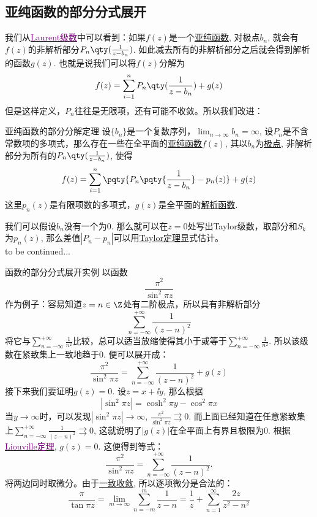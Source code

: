 \documentclass[UTF8]{ctexart}
\newcommand{\hyperrefc}[2]{\hyperref[#1]{\textcolor{purple}{#2}}}
\newcommand{\continued}{{\Large to be continued...}}
\newcommand{\AnalyticalFunction}{\hyperref[dfn:AnalyticalFunction]{解析函数}}
\newcommand{\UniformConvergence}{\hyperref[dfn:UniformConvergence]{一致收敛}}
\newcommand{\MeromorphicFunction}{\hyperref[dfn:MeromorphicFunction]{亚纯函数}}
\newcommand{\TaylorThm}{\hyperref[thm:Taylor]{Taylor定理}}
\begin{document}
\subsection{亚纯函数的部分分式展开}
我们从\hyperrefc{thm:Laurent}{Laurent级数}中可以看到：如果$f(z)$是一个\MeromorphicFunction , 对极点$b_n$, 就会有$f(z)$的非解析部分$P_n\qty(\frac{1}{z-b_n})$. 如此减去所有的非解析部分之后就会得到解析的函数$g(z)$. 也就是说我们可以将$f(z)$分解为
\[f(z)=\sum_{i=1}^{n}P_n\qty(\frac{1}{z-b_n})+g(z)\]
但是这样定义，$P_n$往往是无限项，还有可能不收敛。所以我们改进：
\begin{thm}
    {亚纯函数的部分分解定理}
    设$\{b_n\}$是一个复数序列，$\lim_{n\to\infty }b_n=\infty$, 设$P_n$是不含常数项的多项式，那么存在一些在全平面的\MeromorphicFunction $f(z)$, 其以$b_n$为\hyperref[dfn:PolarSingularity]{极点}, 非解析部分为所有的$P_n\qty(\frac{1}{z-b_n})$, 使得
    \[f(z)=\sum_{i=1}^{n}\pqty{P_n\pqty{\frac{1}{z-b_n}}-p_n(z)}+g(z)\]
    这里$p_n(z)$是有限项数的多项式，$g(z)$是全平面的\AnalyticalFunction . 
\end{thm}
\begin{prf}
    我们可以假设$b_n$没有一个为0. 那么就可以在$z=0$处写出Taylor级数，取部分和$S_k$为$p_n(z)$, 那么差值$|P_n-p_n|$可以用\TaylorThm 显式估计。\\
    \continued
\end{prf}
\begin{xmp}
    {函数的部分分式展开实例}
    以函数
    \[\frac{\pi^2}{\sin^2\pi z}\]
    作为例子：容易知道$z=n\in\Z$处有二阶极点，所以具有非解析部分
    \[\sum_{n=-\infty}^{+\infty}\frac{1}{(z-n)^2}\]
    将它与$\sum\limits_{n=-\infty}^{+\infty}\frac{1}{n^2}$比较，总可以适当放缩使得其小于或等于$\sum\limits_{n=-\infty}^{+\infty}\frac{1}{n^2}$. 所以该级数在紧致集上一致地趋于0. 便可以展开成：
    \[\frac{\pi^2}{\sin^2\pi z}=\sum_{n=-\infty}^{+\infty}\frac{1}{(z-n)^2}+g(z)\]
    接下来我们要证明$g(z)=0$. 设$z=x+\ii y$, 那么根据
    \[|\sin^2\pi z|=\cosh^2\pi y-\cos^2\pi x\]
    当$y\to\infty$时，可以发现$|\sin^2\pi z|\to\infty$, $\frac{\pi^2}{\sin^2\pi z}\rightrightarrows 0$. 而上面已经知道在任意紧致集上$\sum_{n=-\infty}^{+\infty}\frac{1}{(z-n)^2}\rightrightarrows 0$, 这就说明了$|g(z)|$在全平面上有界且极限为0. 根据\hyperrefc{thm:Liouville}{Liouville定理}, $g(z)=0$. 这便得到等式：
    \[\frac{\pi^2}{\sin^2\pi z}=\sum_{n=-\infty}^{+\infty}\frac{1}{(z-n)^2}.\]
    将两边同时取微分。由于\UniformConvergence , 所以逐项微分是合法的：
    \[\frac{\pi}{\tan\pi z}=\lim_{m\to\infty}\sum_{n=-m}^{m}\frac{1}{z-n}=\frac{1}{z}+\sum_{n=1}^{\infty}\frac{2z}{z^2-n^2}\]
\end{xmp}
\end{document}
